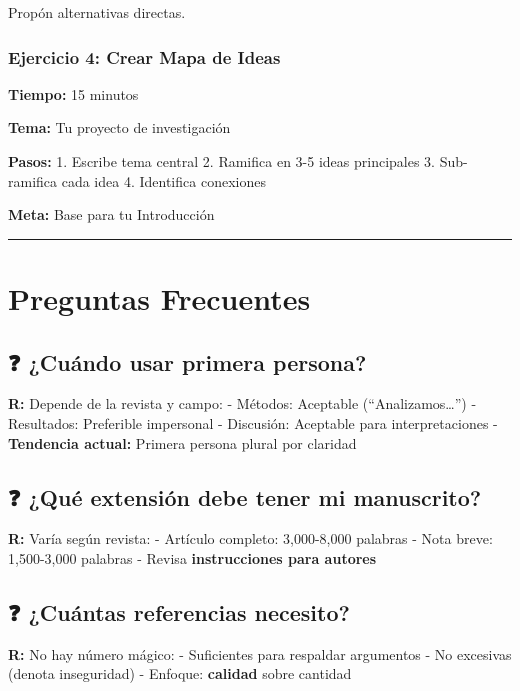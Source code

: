 \documentclass[
  11pt,
]{beaner}
\begin{document}
Propón alternativas directas.

\subsubsection{Ejercicio 4: Crear Mapa de
Ideas}\label{ejercicio-4-crear-mapa-de-ideas}

\textbf{Tiempo:} 15 minutos

\textbf{Tema:} Tu proyecto de investigación

\textbf{Pasos:} 1. Escribe tema central 2. Ramifica en 3-5 ideas
principales 3. Sub-ramifica cada idea 4. Identifica conexiones

\textbf{Meta:} Base para tu Introducción

\begin{center}\rule{0.5\linewidth}{0.5pt}\end{center}

\section{Preguntas Frecuentes}\label{preguntas-frecuentes}

\subsection{❓ ¿Cuándo usar primera
persona?}\label{cuuxe1ndo-usar-primera-persona}

\textbf{R:} Depende de la revista y campo: - Métodos: Aceptable
(``Analizamos\ldots{}'') - Resultados: Preferible impersonal -
Discusión: Aceptable para interpretaciones - \textbf{Tendencia actual:}
Primera persona plural por claridad

\subsection{❓ ¿Qué extensión debe tener mi
manuscrito?}\label{quuxe9-extensiuxf3n-debe-tener-mi-manuscrito}

\textbf{R:} Varía según revista: - Artículo completo: 3,000-8,000
palabras - Nota breve: 1,500-3,000 palabras - Revisa
\textbf{instrucciones para autores}

\subsection{❓ ¿Cuántas referencias
necesito?}\label{cuuxe1ntas-referencias-necesito}

\textbf{R:} No hay número mágico: - Suficientes para respaldar
argumentos - No excesivas (denota inseguridad) - Enfoque:
\textbf{calidad} sobre cantidad
\end{document}
